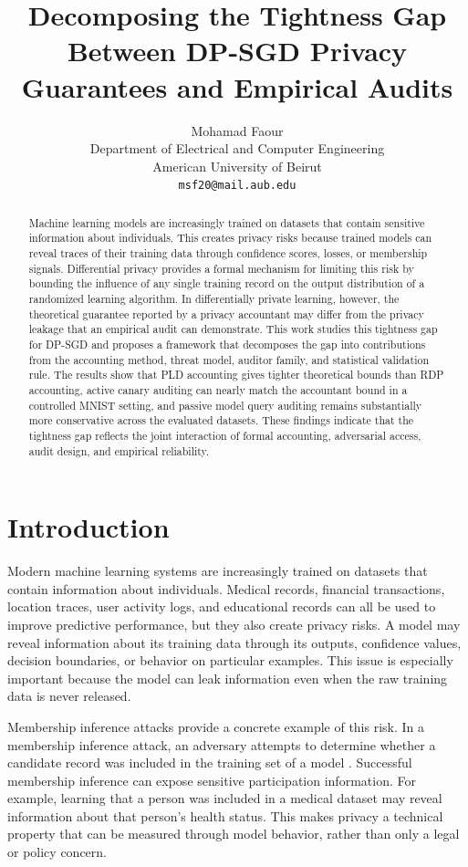 \documentclass{article}
\title{Decomposing the Tightness Gap Between DP-SGD Privacy Guarantees and Empirical Audits}
\author{%
  Mohamad Faour \\
  Department of Electrical and Computer Engineering \\
  American University of Beirut \\
  \texttt{msf20@mail.aub.edu}
}
\begin{document}
\maketitle

\begin{abstract}
Machine learning models are increasingly trained on datasets that contain sensitive information about individuals. This creates privacy risks because trained models can reveal traces of their training data through confidence scores, losses, or membership signals. Differential privacy provides a formal mechanism for limiting this risk by bounding the influence of any single training record on the output distribution of a randomized learning algorithm. In differentially private learning, however, the theoretical guarantee reported by a privacy accountant may differ from the privacy leakage that an empirical audit can demonstrate. This work studies this tightness gap for DP-SGD and proposes a framework that decomposes the gap into contributions from the accounting method, threat model, auditor family, and statistical validation rule. The results show that PLD accounting gives tighter theoretical bounds than RDP accounting, active canary auditing can nearly match the accountant bound in a controlled MNIST setting, and passive model query auditing remains substantially more conservative across the evaluated datasets. These findings indicate that the tightness gap reflects the joint interaction of formal accounting, adversarial access, audit design, and empirical reliability.
\end{abstract}

\section{Introduction}
Modern machine learning systems are increasingly trained on datasets that contain information about individuals. Medical records, financial transactions, location traces, user activity logs, and educational records can all be used to improve predictive performance, but they also create privacy risks. A model may reveal information about its training data through its outputs, confidence values, decision boundaries, or behavior on particular examples. This issue is especially important because the model can leak information even when the raw training data is never released.

Membership inference attacks provide a concrete example of this risk. In a membership inference attack, an adversary attempts to determine whether a candidate record was included in the training set of a model \citep{shokri2017membership,yeom2018privacy,carlini2022membership}. Successful membership inference can expose sensitive participation information. For example, learning that a person was included in a medical dataset may reveal information about that person's health status. This makes privacy a technical property that can be measured through model behavior, rather than only a legal or policy concern.
\end{document}
